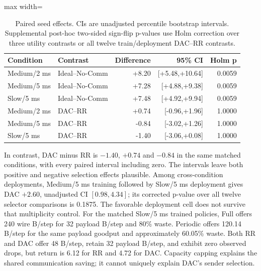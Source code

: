 \documentclass[11pt,a4paper]{article}
\begin{document}
\begin{table}[htbp]\centering\setlength{\tabcolsep}{3pt}\small
\caption{Paired seed effects. CIs are unadjusted percentile bootstrap intervals. Supplemental post-hoc two-sided sign-flip p-values use Holm correction over three utility contrasts or all twelve train/deployment DAC--RR contrasts.}\label{tab:paired}
\vspace{3mm}
\begin{adjustbox}{max width=\linewidth}\begin{tabular}{llrrr}\toprule
Condition & Contrast & Difference & 95\% CI & Holm p\\\midrule
Medium/2 ms & Ideal--No-Comm & +8.20 & [+5.48,+10.64] & 0.0059\\
Medium/5 ms & Ideal--No-Comm & +7.28 & [+4.88,+9.38] & 0.0059\\
Slow/5 ms & Ideal--No-Comm & +7.48 & [+4.92,+9.94] & 0.0059\\
Medium/2 ms & DAC--RR & +0.74 & [-0.96,+1.96] & 1.0000\\
Medium/5 ms & DAC--RR & -0.84 & [-3.02,+1.26] & 1.0000\\
Slow/5 ms & DAC--RR & -1.40 & [-3.06,+0.08] & 1.0000\\
\bottomrule\end{tabular}\end{adjustbox}\end{table}
In contrast, DAC minus RR is $-1.40$, $+0.74$ and $-0.84$ in the same matched conditions, with every paired interval including zero. The intervals leave both positive and negative selection effects plausible. Among cross-condition deployments, Medium/5 ms training followed by Slow/5 ms deployment gives DAC $+2.60$, unadjusted CI $[0.98,4.34]$; its corrected p-value over all twelve selector comparisons is 0.1875. The favorable deployment cell does not survive that multiplicity control.
For the matched Slow/5 ms trained policies, Full offers 240 wire B/step for 32 payload B/step and 80\% waste. Periodic offers 120.14 B/step for the same payload goodput and approximately 60.05\% waste. Both RR and DAC offer 48 B/step, retain 32 payload B/step, and exhibit zero observed drops, but return is 6.12 for RR and 4.72 for DAC. Capacity capping explains the shared communication saving; it cannot uniquely explain DAC's sender selection.
\end{document}

